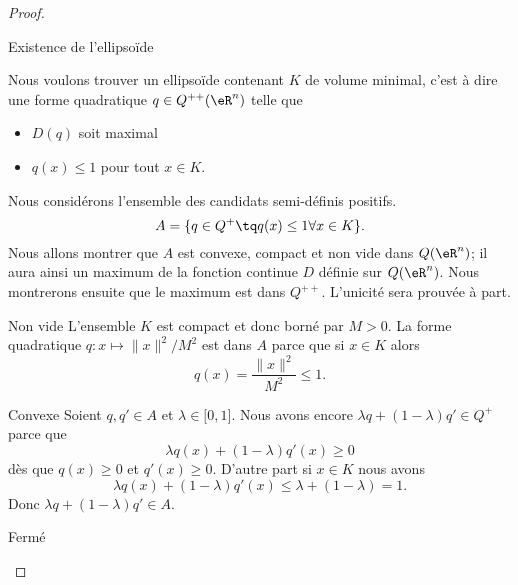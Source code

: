 \begin{proof}
\begin{subproof}
        \item[Existence de l'ellipsoïde]

            Nous voulons trouver un ellipsoïde contenant \( K\) de volume minimal, c'est à dire une forme quadratique \( q\in Q^{++}(\eR^n)\) telle que
            \begin{itemize}
                \item \( D(q)\) soit maximal
                \item \( q(x)\leq 1\) pour tout \( x\in K\).
            \end{itemize}
            Nous considérons l'ensemble des candidats semi-définis positifs.
            \begin{equation}
                A=\{ q\in Q^+\tq q(x)\leq 1\forall x\in K \}.
            \end{equation}
            Nous allons montrer que \( A\) est convexe, compact et non vide dans \( Q(\eR^n)\); il aura ainsi un maximum de la fonction continue \( D\) définie sur \( Q(\eR^n)\). Nous montrerons ensuite que le maximum est dans \( Q^{++}\). L'unicité sera prouvée à part.

            \begin{subproof}
            \item[Non vide]
                L'ensemble \( K\) est compact et donc borné par \( M>0\). La forme quadratique \( q\colon x\mapsto \| x \|^2/M^2\) est dans \( A\) parce que si \( x\in K\) alors 
                \begin{equation}
                    q(x)=\frac{ \| x \|^2 }{ M^2 }\leq 1.
                \end{equation}
            \item[Convexe]
                Soient \( q,q'\in A\) et \( \lambda\in\mathopen[ 0 , 1 \mathclose]\). Nous avons encore \( \lambda q+(1-\lambda)q'\in Q^+\) parce que 
                \begin{equation}
                    \lambda q(x)+(1-\lambda)q'(x)\geq 0
                \end{equation}
                dès que \( q(x)\geq 0\) et \( q'(x)\geq 0\).
            D'autre part si \( x\in K\) nous avons
            \begin{equation}
                \lambda q(x)+(1-\lambda)q'(x)\leq \lambda+(1-\lambda)=1.
            \end{equation}
            Donc \( \lambda q+(1-\lambda)q'\in A\).

        \item[Fermé]


\end{subproof}
\end{subproof}
\end{proof}
